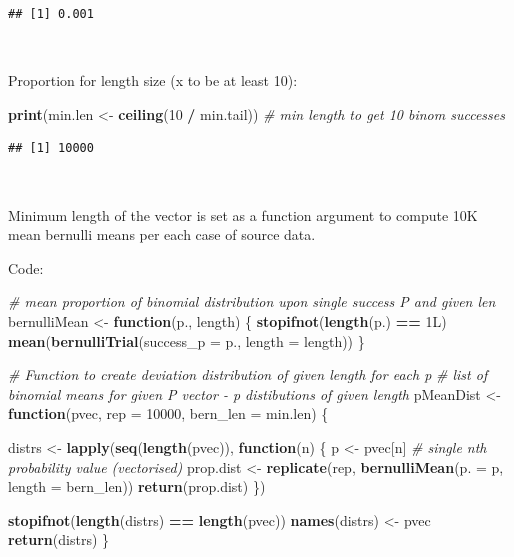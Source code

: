 \documentclass[]{article}
\newenvironment{Shaded}{\begin{snugshade}}{\end{snugshade}}
\newcommand{\CommentTok}[1]{\textcolor[rgb]{0.56,0.35,0.01}{\textit{#1}}}
\newcommand{\ControlFlowTok}[1]{\textcolor[rgb]{0.13,0.29,0.53}{\textbf{#1}}}
\newcommand{\DataTypeTok}[1]{\textcolor[rgb]{0.13,0.29,0.53}{#1}}
\newcommand{\DecValTok}[1]{\textcolor[rgb]{0.00,0.00,0.81}{#1}}
\newcommand{\KeywordTok}[1]{\textcolor[rgb]{0.13,0.29,0.53}{\textbf{#1}}}
\newcommand{\NormalTok}[1]{#1}
\newcommand{\OperatorTok}[1]{\textcolor[rgb]{0.81,0.36,0.00}{\textbf{#1}}}
\newcommand{\StringTok}[1]{\textcolor[rgb]{0.31,0.60,0.02}{#1}}
\begin{document}
\begin{verbatim}
## [1] 0.001
\end{verbatim}

~

Proportion for length size (x to be at least 10):

\begin{Shaded}
\begin{Highlighting}[]
\KeywordTok{print}\NormalTok{(min.len  <-}\StringTok{ }\KeywordTok{ceiling}\NormalTok{(}\DecValTok{10} \OperatorTok{/}\StringTok{ }\NormalTok{min.tail)) }\CommentTok{# min length to get 10 binom successes}
\end{Highlighting}
\end{Shaded}

\begin{verbatim}
## [1] 10000
\end{verbatim}

~

Minimum length of the vector is set as a function argument to compute
10K mean bernulli means per each case of source data.

Code:

\begin{Shaded}
\begin{Highlighting}[]
\CommentTok{# mean proportion of binomial distribution upon single success P and given len}
\NormalTok{bernulliMean <-}\StringTok{ }\ControlFlowTok{function}\NormalTok{(p., length) \{}
        \KeywordTok{stopifnot}\NormalTok{(}\KeywordTok{length}\NormalTok{(p.) }\OperatorTok{==}\StringTok{ }\NormalTok{1L)}
        \KeywordTok{mean}\NormalTok{(}\KeywordTok{bernulliTrial}\NormalTok{(}\DataTypeTok{success_p =}\NormalTok{ p., }\DataTypeTok{length =}\NormalTok{ length))}
\NormalTok{\}}


\CommentTok{# Function to create deviation distribution of given length for each p}
\CommentTok{# list of binomial means for given P vector - p distibutions of given length}
\NormalTok{pMeanDist <-}\StringTok{ }\ControlFlowTok{function}\NormalTok{(pvec, }\DataTypeTok{rep =} \DecValTok{10000}\NormalTok{, }\DataTypeTok{bern_len =}\NormalTok{ min.len) \{}
        
\NormalTok{        distrs <-}\StringTok{ }\KeywordTok{lapply}\NormalTok{(}\KeywordTok{seq}\NormalTok{(}\KeywordTok{length}\NormalTok{(pvec)), }\ControlFlowTok{function}\NormalTok{(n) \{}
\NormalTok{                p <-}\StringTok{ }\NormalTok{pvec[n] }\CommentTok{# single nth probability value (vectorised)}
\NormalTok{                prop.dist <-}\StringTok{ }\KeywordTok{replicate}\NormalTok{(rep, }\KeywordTok{bernulliMean}\NormalTok{(}\DataTypeTok{p. =}\NormalTok{ p, }\DataTypeTok{length =}\NormalTok{ bern_len))}
                \KeywordTok{return}\NormalTok{(prop.dist)}
\NormalTok{        \})}
        
        \KeywordTok{stopifnot}\NormalTok{(}\KeywordTok{length}\NormalTok{(distrs) }\OperatorTok{==}\StringTok{ }\KeywordTok{length}\NormalTok{(pvec))}
        \KeywordTok{names}\NormalTok{(distrs) <-}\StringTok{ }\NormalTok{pvec}
        \KeywordTok{return}\NormalTok{(distrs)}
\NormalTok{\}}
\end{Highlighting}
\end{Shaded}
\end{document}

